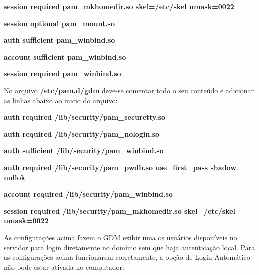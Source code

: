 \textbf{session required pam\_mkhomedir.so skel=/etc/skel umask=0022}

\textbf{session optional pam\_mount.so}

\textbf{auth sufficient pam\_winbind.so}

\textbf{account sufficient pam\_winbind.so}

\textbf{session required pam\_winbind.so}

No arquivo \textbf{/etc/pam.d/gdm} deve-se comentar todo o seu conteúdo e adicionar as linhas abaixo ao inicio do arquivo:

\textbf{auth required /lib/security/pam\_securetty.so}

\textbf{auth required /lib/security/pam\_nologin.so}

\textbf{auth sufficient /lib/security/pam\_winbind.so}

\textbf{auth required /lib/security/pam\_pwdb.so use\_first\_pass shadow nullok}

\textbf{account required /lib/security/pam\_winbind.so}

\textbf{session required /lib/security/pam\_mkhomedir.so skel=/etc/skel umask=0022}

As configurações acima fazem o GDM exibir uma os usuários disponíveis no servidor para login diretamente no domínio sem que haja autenticação local. Para as configurações acima funcionarem corretamente, a opção de Login Automático não pode estar ativada no computador. 